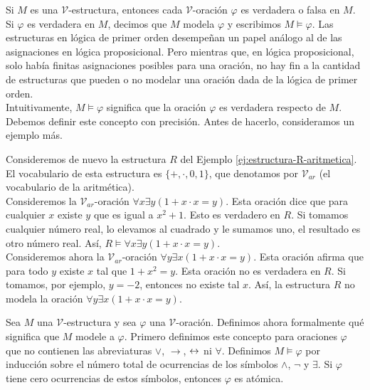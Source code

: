 \documentclass[12pt,a4paper]{book}
\newcommand{\VV}{\mathcal{V}}
\begin{document}
    Si $M$ es una $\VV$-estructura, entonces cada $\VV$-oración $\varphi$ es verdadera o falsa en $M$. Si $\varphi$ es
    verdadera en $M$, decimos que $M$ modela $\varphi$ y escribimos $M\models\varphi$. Las estructuras en lógica de primer
    orden desempeñan un papel análogo al de las asignaciones en lógica proposicional. Pero mientras que, en lógica
    proposicional, solo había finitas asignaciones posibles para una oración, no hay fin a la cantidad de estructuras que
    pueden o no modelar una oración dada de la lógica de primer orden.\\
    Intuitivamente, $M\models\varphi$ significa que la oración $\varphi$ es verdadera respecto de $M$. Debemos definir
    este concepto con precisión. Antes de hacerlo, consideramos un ejemplo más.

    \begin{ejemplo}\label{ej:var-sentencia}
        Consideremos de nuevo la estructura $R$ del Ejemplo \ref{ej:estructura-R-aritmetica}. El vocabulario de esta
        estructura es $\{+,\cdot,0,1\}$, que denotamos por $\VV_{ar}$ (el vocabulario de la aritmética).\\
        Consideremos la $\VV_{ar}$-oración $\forall x\exists y(1+x\cdot x=y)$. Esta oración dice que para cualquier $x$
        existe $y$ que es igual a $x^{2}+1$. Esto es verdadero en $R$. Si tomamos cualquier número real, lo elevamos al
        cuadrado y le sumamos uno, el resultado es otro número real. Así, $R\models\forall x\exists y(1+x\cdot x=y)$.\\
        Consideremos ahora la $\VV_{ar}$-oración $\forall y\exists x(1+x\cdot x=y)$. Esta oración afirma que para todo
        $y$ existe $x$ tal que $1+x^{2}=y$. Esta oración no es verdadera en $R$. Si tomamos, por ejemplo, $y=-2$, entonces
        no existe tal $x$. Así, la estructura $R$ no modela la oración $\forall y\exists x(1+x\cdot x=y)$.
    \end{ejemplo}

    Sea $M$ una $\VV$-estructura y sea $\varphi$ una $\VV$-oración. Definimos ahora formalmente qué significa que $M$
    modele a $\varphi$. Primero definimos este concepto para oraciones $\varphi$ que no contienen las abreviaturas $\vee$,
    $\rightarrow$, $\leftrightarrow$ ni $\forall$. Definimos $M\models\varphi$ por inducción sobre el número total de ocurrencias de
    los símbolos $\wedge$, $\neg$ y $\exists$. Si $\varphi$ tiene cero ocurrencias de estos símbolos, entonces $\varphi$ es
    atómica.
\end{document}
